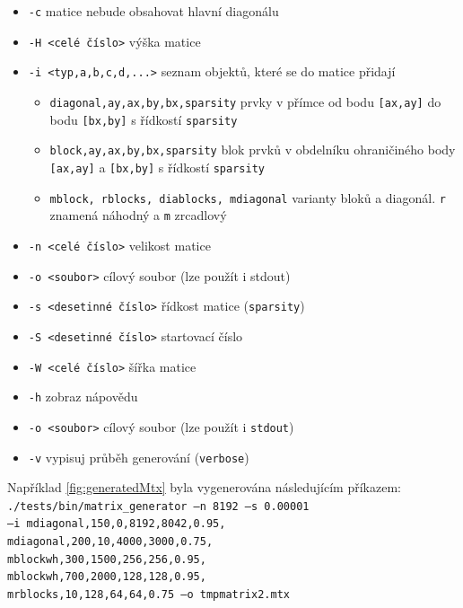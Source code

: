 \documentclass[thesis=B,czech]{FITthesis}[2012/06/26]
\begin{document}
\begin{itemize}
	\item \texttt{-c} matice nebude obsahovat hlavní diagonálu
 	\item \texttt{-H <celé číslo>} výška matice
 	\item \texttt{-i <typ,a,b,c,d,...>} seznam objektů, které se do matice přidají
 	\begin{itemize}
 	\item \texttt{diagonal,ay,ax,by,bx,sparsity} prvky v přímce od bodu \texttt{[ax,ay]} do bodu \texttt{[bx,by]} s řídkostí \texttt{sparsity}
 	\item \texttt{block,ay,ax,by,bx,sparsity} blok prvků v obdelníku ohraničiného body \texttt{[ax,ay]} a \texttt{[bx,by]} s  řídkostí \texttt{sparsity}
 	\item \texttt{mblock, rblocks, diablocks, mdiagonal} varianty bloků a diagonál. \texttt{r} znamená náhodný a \texttt{m} zrcadlový
 	\end{itemize}
 	\item \texttt{-n <celé číslo>} velikost matice
 	\item \texttt{-o <soubor>} cílový soubor (lze použít i stdout)
 	\item \texttt{-s <desetinné číslo>} řídkost matice (\texttt{sparsity})
 	\item \texttt{-S <desetinné číslo>} startovací číslo
 	\item \texttt{-W <celé číslo>} šířka matice
 \end{itemize}
 
 \begin{itemize}
 	\item \texttt{-h} zobraz nápovědu
 	\item \texttt{-o <soubor>} cílový soubor (lze použít i \texttt{stdout}) 
 	\item \texttt{-v} vypisuj průběh generování (\texttt{verbose})
 \end{itemize}

 Například \ref{fig:generatedMtx} byla vygenerována následujícím příkazem: \\
 \texttt{./tests/bin/matrix\_generator --n 8192 --s 0.00001 \\
 --i mdiagonal,150,0,8192,8042,0.95, \\
 mdiagonal,200,10,4000,3000,0.75, \\
 mblockwh,300,1500,256,256,0.95, \\
 mblockwh,700,2000,128,128,0.95, \\
 mrblocks,10,128,64,64,0.75 --o \/tmp\/matrix2.mtx}
\end{document}
